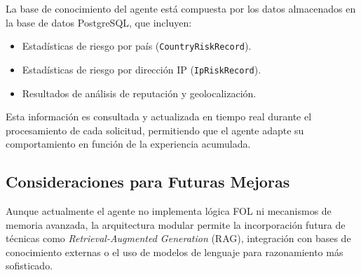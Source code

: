 La base de conocimiento del agente está compuesta por los datos almacenados en la base de datos PostgreSQL, que incluyen:

\begin{itemize}
    \item Estadísticas de riesgo por país (\texttt{CountryRiskRecord}).
    \item Estadísticas de riesgo por dirección IP (\texttt{IpRiskRecord}).
    \item Resultados de análisis de reputación y geolocalización.
\end{itemize}

Esta información es consultada y actualizada en tiempo real durante el procesamiento de cada solicitud, permitiendo que el agente adapte su comportamiento en función de la experiencia acumulada.

\subsection{Consideraciones para Futuras Mejoras}

Aunque actualmente el agente no implementa lógica FOL ni mecanismos de memoria avanzada, la arquitectura modular permite la incorporación futura de técnicas como \textit{Retrieval-Augmented Generation} (RAG), integración con bases de conocimiento externas o el uso de modelos de lenguaje para razonamiento más sofisticado.